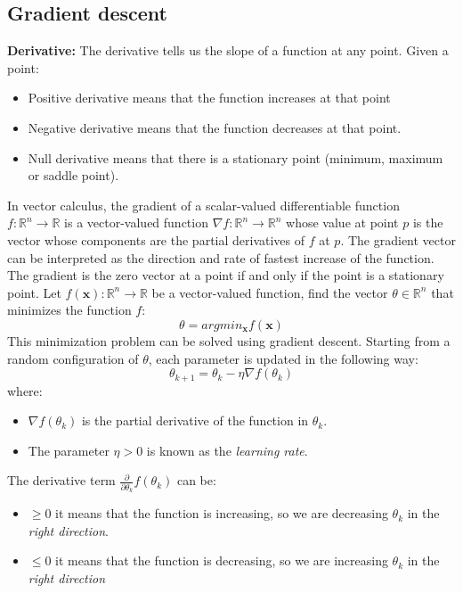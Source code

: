 \subsection{Gradient descent}
\textbf{Derivative:}\newline
The derivative tells us the slope of a function at any point. Given a point:
\begin{itemize}
    \item Positive derivative means that the function increases at that point
    \item Negative derivative means that the function decreases at that point.
    \item Null derivative means that there is a stationary point (minimum, maximum or saddle point).
\end{itemize}
In vector calculus, the gradient of a scalar-valued differentiable function $f: \mathbb{R}^{n} \rightarrow \mathbb{R}$ is a vector-valued function $\nabla f: \mathbb{R}^{n} \rightarrow \mathbb{R}^{n}$ whose value at point $p$ is the vector whose components are the partial derivatives of $f$ at $p$.\newline\newline
The gradient vector can be interpreted as the direction and rate of fastest increase of the function. The gradient is the zero vector at a point if and only if the point is a stationary point.\newline\newline
Let $f(\textbf{x}): \mathbb{R}^{n} \rightarrow \mathbb{R}$ be a vector-valued function, find the vector $\theta \in \mathbb{R}^{n}$ that minimizes the function $f$:
\[\theta = argmin_{\textbf{x}}f(\textbf{x})\]
This minimization problem can be solved using gradient descent. Starting from a random configuration of $\theta$, each parameter is updated in the following way:
\[\theta_{k+1} = \theta_{k} - \eta \nabla f(\theta_{k})\]
where: 
\begin{itemize}
    \item $\nabla f(\theta_{k})$ is the partial derivative of the function in $\theta_{k}$.
    \item The parameter $\eta > 0$ is known as the \textit{learning rate}. 
\end{itemize}
The derivative term $\frac{\partial}{\partial \theta_{k}}f(\theta_{k})$ can be:
\begin{itemize}
    \item $\geq 0$ it means that the function is increasing, so we are decreasing $\theta_{k}$ in the \textit{right direction}.
    \item $\leq 0$ it means that the function is decreasing, so we are increasing $\theta_{k}$ in the \textit{right direction}
\end{itemize}
